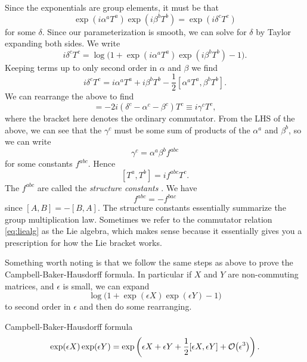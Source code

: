 Since the exponentials are group elements, it must be that
\begin{equation}
  \exp(i\alpha^aT^a)\exp(i\beta^bT^b)=\exp(i\delta^cT^c)
\end{equation}
for some $\delta$. Since our parameterization is smooth, we can solve for
$\delta$ by Taylor expanding both sides. We write
\begin{equation}
  i\delta^cT^c=\log\big(1+\exp(i\alpha^aT^a)\exp(i\beta^bT^b)-1\big).
\end{equation}
Keeping terms up to only second order in $\alpha$ and $\beta$ we find
\begin{equation}
  i\delta^cT^c=i\alpha^aT^a+i\beta^bT^b-\frac{1}{2}[\alpha^aT^a,\beta^bT^b].
\end{equation}
We can rearrange the above to find
\begin{equation}
  [\alpha^aT^a,\beta^bT^b]=
   -2i(\delta^c-\alpha^c-\beta^c)T^c\equiv i\gamma^cT^c,
\end{equation}
where the bracket here denotes the ordinary commutator.
From the LHS of the above, we can see that the $\gamma^c$ must be some
sum of products of the $\alpha^a$ and $\beta^b$, so we can write
\begin{equation}\label{eq:gammac}
  \gamma^c=\alpha^a\beta^bf^{abc}
\end{equation}
for some constants $f^{abc}$. Hence
\begin{equation}\label{eq:liealg}
  [T^a,T^b]=if^{abc}T^c.
\end{equation}
The $f^{abc}$ are called the {\it structure constants}
. We have
\begin{equation}
  f^{abc}=-f^{bac}
\end{equation}
since $[A,B]=-[B,A]$. The structure constants essentially summarize the
group multiplication law. Sometimes we refer to the commutator relation
\eqref{eq:liealg} as the Lie algebra, which makes sense because it
essentially gives you a prescription for how the Lie bracket works.

Something worth noting is that we follow the same steps
as above to prove the Campbell-Baker-Hausdorff formula. In particular
if $X$ and $Y$ are non-commuting matrices, and $\epsilon$ is small,
we can expand
\begin{equation}
  \log\big(1+\exp(\epsilon X)\exp(\epsilon Y)-1\big)
\end{equation}
to second order in $\epsilon$ and then do some rearranging.
\begin{theorem}{Campbell-Baker-Hausdorff formula}{}
  $$
    \exp(\epsilon X)\exp(\epsilon Y)
      =\exp\left(\epsilon X+\epsilon Y+\frac{1}{2}[\epsilon X,\epsilon Y]
                           +\order{\epsilon^3}\right).
  $$
\end{theorem}

